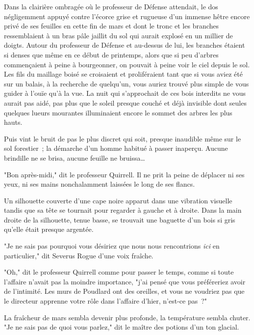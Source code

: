 
Dans la clairière ombragée où le professeur de Défense attendait, le dos négligemment appuyé contre l'écorce grise et rugueuse d'un immense hêtre encore privé de ses feuilles en cette fin de mars et dont le tronc et les branches ressemblaient à un bras pâle jaillit du sol qui aurait explosé en un millier de doigts. Autour du professeur de Défense et au-dessus de lui, les branches étaient si denses que même en ce début de printemps, alors que si peu d'arbres commençaient à peine à bourgeonner, on pouvait à peine voir le ciel depuis le sol. Les fils du maillage boisé se croisaient et proliféraient tant que si vous aviez été sur un balais, à la recherche de quelqu'un, vous auriez trouvé plus simple de vous guider à l'ouïe qu'à la vue. La nuit qui s'approchait de ces bois interdits ne vous aurait pas aidé, pas plus que le soleil presque couché et déjà invisible dont seules quelques lueurs mourantes illuminaient encore le sommet des arbres les plus hauts.

Puis vint le bruit de pas le plus discret qui soit, presque inaudible même sur le sol forestier~; la démarche d'un homme habitué à passer inaperçu. Aucune brindille ne se brisa, aucune feuille ne bruissa…

"Bon après-midi," dit le professeur Quirrell. Il ne prit la peine de déplacer ni ses yeux, ni ses mains nonchalamment laissées le long de ses flancs.

Un silhouette couverte d'une cape noire apparut dans une vibration visuelle tandis que sa tête se tournait pour regarder à gauche et à droite. Dans la main droite de la silhouette, tenue basse, se trouvait une baguette d'un bois si gris qu'elle était presque argentée.

"Je ne sais pas pourquoi vous désiriez que nous nous rencontrions \emph{ici} en particulier," dit Severus Rogue d'une voix fraîche.

"Oh," dit le professeur Quirrell comme pour passer le temps, comme si toute l'affaire n'avait pas la moindre importance, "j'ai pensé que vous préféreriez avoir de l'intimité. Les murs de Poudlard ont des oreilles, et vous ne voudriez pas que le directeur apprenne votre rôle dans l'affaire d'hier, n'est-ce pas~?"

La fraîcheur de mars sembla devenir plus profonde, la température sembla chuter. "Je ne sais pas de quoi vous parlez," dit le maître des potions d'un ton glacial.

